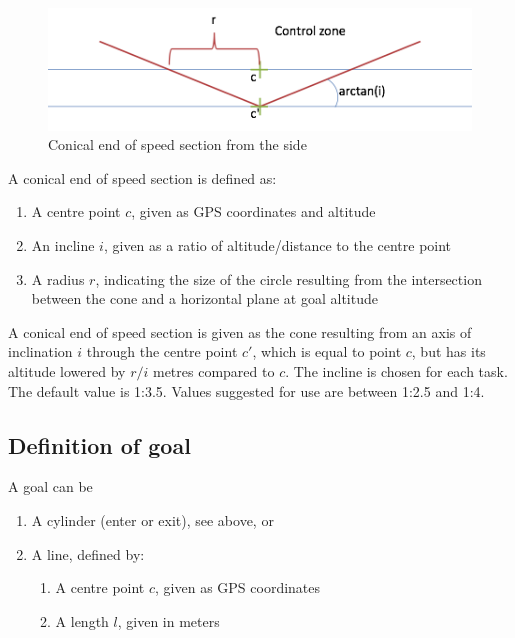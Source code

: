 \documentclass{article}
\begin{document}
\begin{figure}[h]
    \centering
    \includegraphics[scale=1]{img/conical-end.png}
    \caption{Conical end of speed section from the side}
\end{figure}

\begin{pg}
A conical end of speed section is defined as:
\begin{enumerate}
    \item A centre point \(c\), given as GPS coordinates and altitude
    \item
        An incline \(i\), given as a ratio of altitude/distance to the centre
        point
    \item
        A radius \(r\), indicating the size of the circle resulting from the
        intersection between the cone and a horizontal plane at goal altitude
\end{enumerate}

A conical end of speed section is given as the cone resulting from an axis of
inclination \(i\) through the centre point \(c'\), which is equal to point
\(c\), but has its altitude lowered by \(r/i\) metres compared to \(c\).  The
incline is chosen for each task. The default value is 1:3.5. Values suggested
for use are between
1:2.5 and 1:4.
\end{pg}
\subsection{Definition of goal}
\label{sec:goal-definition}
A goal can be
\begin{enumerate}
    \item A cylinder (enter or exit), see above, or
    \item A line, defined by:
    \begin{enumerate}
        \item A centre point \(c\), given as GPS coordinates
        \item A length \(l\), given in meters
    \end{enumerate}
\end{enumerate}
\end{document}
